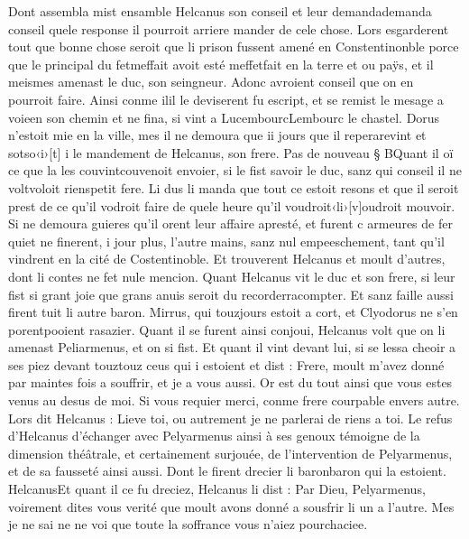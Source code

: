 \documentclass{article}
\begin{document}
\begin{pages}
\pstart Dont assembla
   mist ensamble 
   Helcanus son conseil et leur 
   demandademanda conseil 
   quele response il pourroit arriere mander de cele chose. Lors esgarderent tout que bonne chose seroit que 
   li prison fussent amené en Constentinonble porce que le principal du 
   fetmeffait 
   avoit esté meffetfait en la terre et ou paÿs, et il meismes amenast 
   le duc, son seingneur. 
   Adonc avroient conseil que on en pourroit faire. Ainsi conme ilil le 
   deviserent fu escript, et se remist 
   le mesage a voieen son chemin 
   et ne fina, si vint a LucembourcLembourc 
   le chastel. Dorus n’estoit mie en la ville, 
   mes il ne demoura que ii jours que il reperarevint et 
   sotso‹i›[t] i 
   le mandement de Helcanus, son frere. \pend
\pstart Pas de nouveau § BQuant il oï 
   ce 
   que la les couvintcouvenoit envoier, si le fist savoir 
   le duc, sanz qui conseil il ne voltvoloit 
   rienspetit fere. Li dus li manda 
   que tout ce estoit resons 
      et que il seroit prest de ce qu’il vodroit faire de quele heure qu’il 
      voudroit‹li›[v]oudroit mouvoir. 
   Si ne demoura guieres qu’il orent leur affaire apresté, et furent c armeures de fer 
   quiet ne finerent, i jour plus, l’autre mains, 
   sanz nul empeeschement, tant qu’il vindrent en la cité de Costentinoble. 
   Et trouverent Helcanus et moult d’autres, dont li contes ne fet nule mencion. \pend 
\pstart Quant Helcanus vit le duc et 
   son frere, si leur fist si grant joie que grans anuis seroit du 
   recorderracompter. 
   Et sanz faille aussi firent tuit li autre baron. Mirrus, qui touzjours estoit a cort, 
   et Clyodorus ne s’en porentpooient 
   rasazier. 
   Quant il se furent ainsi conjoui, 
   Helcanus volt que on li amenast Peliarmenus, et on si fist. 
   Et quant il vint devant lui, si se lessa cheoir a ses piez devant 
   touztouz ceus qui i estoient et dist :
   Frere, moult m’avez donné par maintes fois a souffrir, et je a vous aussi. 
   Or est du tout ainsi que vous estes venus au desus de moi. Si vous requier merci, conme frere courpable envers autre.
   Lors dit Helcanus :
   Lieve toi, ou autrement je ne parlerai de riens a toi.
   Le refus d'Helcanus d'échanger avec Pelyarmenus ainsi à ses genoux témoigne de la dimension 
   théâtrale, et certainement surjouée, de l'intervention de Pelyarmenus, et de sa fausseté ainsi aussi.
   Dont le firent drecier li baronbaron qui la estoient. 
   HelcanusEt quant il ce fu dreciez, Helcanus 
   li dist :
   Par Dieu, Pelyarmenus, voirement dites vous verité que moult avons donné a sousfrir 
   li un a l’autre. Mes je ne sai ne ne voi que toute la soffrance vous n’aiez pourchaciee. 

\end{pages}
\end{document}
